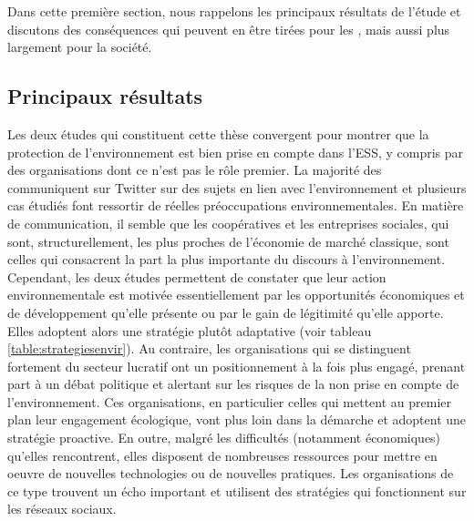   Dans cette première section, nous rappelons les principaux résultats de l'étude et discutons des conséquences qui peuvent en être tirées pour les \oess, mais aussi plus largement pour la société.

    \subsection{Principaux résultats}

        Les deux études qui constituent cette thèse convergent pour montrer que la protection de l'environnement est bien prise en compte dans l'ESS, y compris par des organisations dont ce n'est pas le rôle premier. La majorité des \oess communiquent sur Twitter sur des sujets en lien avec l'environnement et plusieurs cas étudiés font ressortir de réelles préoccupations environnementales. En matière de communication, il semble que les coopératives et les entreprises sociales, qui sont, structurellement, les plus proches de l'économie de marché classique, sont celles qui consacrent la part la plus importante du discours à l'environnement. Cependant, les deux études permettent de constater que leur action environnementale est motivée essentiellement par les opportunités économiques et de développement qu'elle présente ou par le gain de légitimité qu'elle apporte. Elles adoptent alors une stratégie plutôt adaptative (voir tableau \ref{table:strategiesenvir}). Au contraire, les organisations qui se distinguent fortement du secteur lucratif ont un positionnement à la fois plus engagé, prenant part à un débat politique et alertant sur les risques de la non prise en compte de l'environnement. Ces organisations, en particulier celles qui mettent au premier plan leur engagement écologique, vont plus loin dans la démarche et adoptent une stratégie proactive. En outre, malgré les difficultés (notamment économiques) qu'elles rencontrent, elles disposent de nombreuses ressources pour mettre en oeuvre de nouvelles technologies ou de nouvelles pratiques. Les organisations de ce type trouvent un écho important et utilisent des stratégies qui fonctionnent sur les réseaux sociaux. \\

